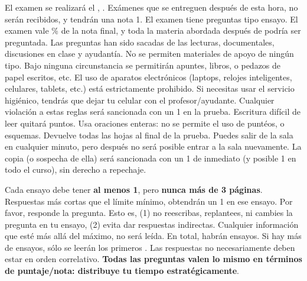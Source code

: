 \documentclass{article}
\begin{document}
El examen se realizar\'a el \underline{{\unskip}}, {\unskip}. Ex\'amenes que se entreguen despu\'es de esta hora, no ser\'an recibidos, y tendr\'an una nota 1. El examen tiene {\unskip} preguntas tipo ensayo. El examen vale {\unskip}\% de la nota final, y toda la materia abordada despu\'es de {\unskip} podr\'ia ser preguntada. Las preguntas han sido sacadas de las lecturas, documentales, discusiones en clase y ayudant\'ia. No se permiten materiales de apoyo de ning\'un tipo. Bajo ninguna circunstancia se permitir\'an apuntes, libros, o pedazos de papel escritos, etc. El uso de aparatos electr\'onicos (laptops, relojes inteligentes, celulares, tablets, etc.) est\'a estrictamente prohibido. Si necesitas usar el servicio higi\'enico, tendr\'as que dejar tu celular con el profesor/ayudante. Cualquier violaci\'on a estas reglas ser\'a sancionada con un 1 en la prueba.  Escritura dif\'icil de leer quitar\'a puntos. Usa oraciones enteras: no se permite el uso de punt\'eos, o esquemas. Devuelve todas las hojas al final de la prueba. Puedes salir de la sala en cualquier minuto, pero despu\'es no ser\'a posible entrar a la sala nuevamente. La copia (o sospecha de ella) ser\'a sancionada con un 1 de inmediato (y posible 1 en todo el curso), sin derecho a repechaje. 

Cada ensayo debe tener {\bf al menos 1}, pero {\bf nunca m\'as de 3 p\'aginas}. Respuestas m\'as cortas que el l\'imite m\'inimo, obtendr\'an un 1 en ese ensayo. Por favor, responde la pregunta. Esto es, (1) no reescribas, replantees, ni cambies la pregunta en tu ensayo, (2) evita dar respuestas indirectas. Cualquier informaci\'on que est\'e m\'as all\'a del m\'aximo, no ser\'a le\'ida. En total, habr\'an {\unskip} ensayos. Si hay m\'as de {\unskip} ensayos, s\'olo se leer\'an los primeros {\unskip}. Las respuestas no necesariamente deben estar en orden correlativo. {\bf Todas las preguntas valen lo mismo en t\'erminos de puntaje/nota: distribuye tu tiempo estrat\'egicamente}.
\end{document}
